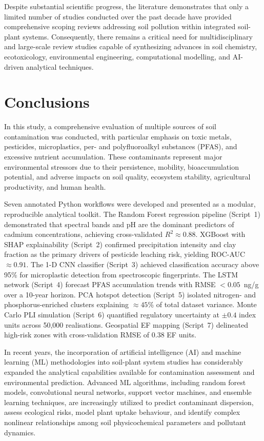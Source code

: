 \documentclass[environments,article,submit,pdftex,moreauthors]{Definitions/mdpi}
\begin{document}
Despite substantial scientific progress, the literature demonstrates that only
a limited number of studies conducted over the past decade have provided
comprehensive scoping reviews addressing soil pollution within integrated
soil-plant systems. Consequently, there remains a critical need for
multidisciplinary and large-scale review studies capable of synthesizing
advances in soil chemistry, ecotoxicology, environmental engineering,
computational modelling, and AI-driven analytical techniques.

\section{Conclusions}\label{sec7}

In this study, a comprehensive evaluation of multiple sources of soil
contamination was conducted, with particular emphasis on toxic metals,
pesticides, microplastics, per- and polyfluoroalkyl substances (PFAS), and
excessive nutrient accumulation. These contaminants represent major
environmental stressors due to their persistence, mobility, bioaccumulation
potential, and adverse impacts on soil quality, ecosystem stability,
agricultural productivity, and human health.

Seven annotated Python workflows were developed and presented as a modular,
reproducible analytical toolkit. The Random Forest regression pipeline
(Script~1) demonstrated that spectral bands and pH are the dominant predictors
of cadmium concentrations, achieving cross-validated $R^2 \approx 0.88$.
XGBoost with SHAP explainability (Script~2) confirmed precipitation intensity
and clay fraction as the primary drivers of pesticide leaching risk, yielding
ROC-AUC $\approx 0.91$. The 1-D CNN classifier (Script~3) achieved
classification accuracy above 95\% for microplastic detection from
spectroscopic fingerprints. The LSTM network (Script~4) forecast PFAS
accumulation trends with RMSE $< 0.05$~ng/g over a 10-year horizon. PCA
hotspot detection (Script~5) isolated nitrogen- and phosphorus-enriched
clusters explaining $\approx 45$\% of total dataset variance. Monte Carlo
PLI simulation (Script~6) quantified regulatory uncertainty at $\pm 0.4$
index units across 50,000 realisations. Geospatial EF mapping (Script~7)
delineated high-risk zones with cross-validation RMSE of 0.38 EF units.

In recent years, the incorporation of artificial intelligence (AI) and machine
learning (ML) methodologies into soil-plant system studies has considerably
expanded the analytical capabilities available for contamination assessment
and environmental prediction. Advanced ML algorithms, including random forest
models, convolutional neural networks, support vector machines, and ensemble
learning techniques, are increasingly utilized to predict contaminant
dispersion, assess ecological risks, model plant uptake behaviour, and identify
complex nonlinear relationships among soil physicochemical parameters and
pollutant dynamics.
\end{document}
